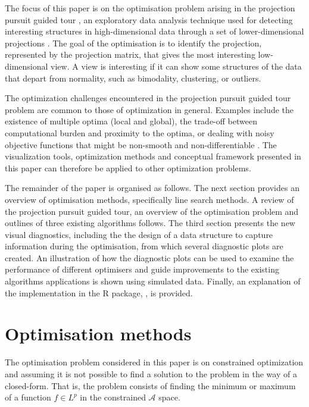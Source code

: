 The focus of this paper is on the optimisation problem arising in the
projection pursuit guided tour \citep{buja2005computational}, an
exploratory data analysis technique used for detecting interesting
structures in high-dimensional data through a set of lower-dimensional
projections \citep{cook2008grand}. The goal of the optimisation is to
identify the projection, represented by the projection matrix, that
gives the most interesting low-dimensional view. A view is interesting
if it can show some structures of the data that depart from normality,
such as bimodality, clustering, or outliers.

The optimization challenges encountered in the projection pursuit guided
tour problem are common to those of optimization in general. Examples
include the existence of multiple optima (local and global), the
trade-off between computational burden and proximity to the optima, or
dealing with noisy objective functions that might be non-smooth and
non-differentiable \citep{jones1998efficient}. The visualization tools,
optimization methods and conceptual framework presented in this paper
can therefore be applied to other optimization problems.

The remainder of the paper is organised as follows. The next section
provides an overview of optimisation methods, specifically line search
methods. A review of the projection pursuit guided tour, an overview of
the optimisation problem and outlines of three existing algorithms
follows. The third section presents the new visual diagnostics,
including the the design of a data structure to capture information
during the optimisation, from which several diagnostic plots are
created. An illustration of how the diagnostic plots can be used to
examine the performance of different optimisers and guide improvements
to the existing algorithms applications is shown using simulated data.
Finally, an explanation of the implementation in the R package,
 \citep{ferrn}, is provided.

\hypertarget{optim}{%
\section{Optimisation methods}\label{optim}}

The optimisation problem considered in this paper is on constrained
optimization \citep{bertsekas2014constrained} and assuming it is not
possible to find a solution to the problem in the way of a closed-form.
That is, the problem consists of finding the minimum or maximum of a
function \(f \in L^p\) in the constrained \(\mathcal{A}\) space.

